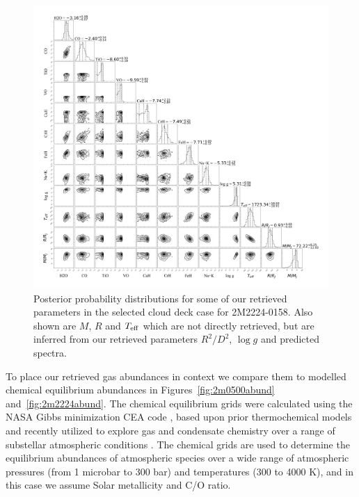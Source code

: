 \documentclass[useAMS,usenatbib]{mn2e}
\begin{document}
\begin{figure}
\hspace{-1.0cm}
\includegraphics[width=550pt]{2M2224_THICK_POW_post_corner_ucl.png}
\caption{Posterior probability distributions for some of our retrieved parameters in the selected cloud deck case for 2M2224-0158. Also shown are $M$, $R$ and $T_{\rm eff}$ which are not directly retrieved, but are inferred from our retrieved parameters $R^2/D^2$, $\log g$ and predicted spectra. 
\label{fig:2m2224thickPOST}}
\end{figure}




To place our retrieved gas abundances in context we compare them to modelled chemical equilibrium abundances in Figures~\ref{fig:2m0500abund} and~\ref{fig:2m2224abund}. 
The chemical equilibrium grids were calculated using the NASA Gibbs minimization CEA code \citep[see  ][]{mcbride1994}, based upon prior thermochemical models \citep{fegley1994,fegley1996,lodders1999,lodders2002,lodders2010,lodders2002b,lodders2006,visscher2006,visscher2010a,visscher2012,moses2012,moses2013} and recently utilized to explore gas and condensate chemistry over a range of substellar atmospheric conditions \citep{morley2012,morley2013,skemer2016,kataria2016,wakeford2016}.
The chemical grids are used to determine the equilibrium abundances of atmospheric species over a wide range of atmospheric pressures (from 1 microbar to 300 bar) and temperatures (300 to 4000 K), and in this case we assume Solar metallicity and C/O ratio. 
\end{document}
